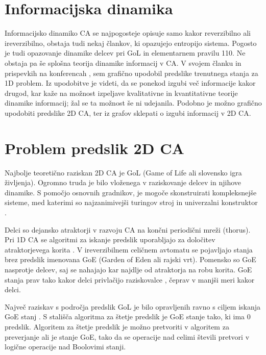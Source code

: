 \documentclass[12pt,a4paper,openany,twoside]{book}
\begin{document}
\section{Informacijska dinamika}

Informacijsko dinamiko CA se najpogosteje opisuje samo kakor reverzibilno ali ireverzibilno,
obstaja tudi nekaj člankov, ki opazujejo entropijo sistema.
Pogosto je tudi opazovanje dinamike delcev pri GoL in elementarnem pravilu 110.
Ne obstaja pa še splošna teorija dinamike informacij v CA.
V svojem članku \cite{JerasDobnikar2007} in prispevkih na konferencah \cite{DBLP:conf/iccS/JerasD06, DBLP:conf/automata/Jeras08},
sem grafično upodobil predslike trenutnega stanja za 1D problem.
Iz upodobitve je videti, da se ponekod izgubi več informacije kakor drugod,
kar kaže na možnost izpeljave kvalitativne in kvantitativne teorije dinamike informacij;
žal se ta možnost še ni udejanila. Podobno je možno grafično upodobiti predslike 2D CA,
ter iz grafov sklepati o izgubi informacij v 2D CA.

\section{Problem predslik 2D CA}

Najbolje teoretično raziskan 2D CA je GoL (Game of Life ali slovensko igra življenja).
Ogromno truda je bilo vloženega v raziskovanje delcev in njihove dinamike. S pomočjo
osnovnih gradnikov, je mogoče skonstruirati kompleksnejše sisteme, med katerimi so
najzanimivejši turingov stroj \cite{Rendell2001} in univerzalni konstruktor \cite{Greene2013}.

Delci so dejansko atraktorji v razvoju CA na končni periodični mreži (thorus).
Pri 1D CA se algoritmi za iskanje predslik uporabljajo za določitev atraktorjevega korita \cite{Wuensche1992}.
V ireverzibilnem celičnem avtomatu se pojavljajo stanja brez predslik imenovana GoE
(Garden of Eden ali rajski vrt). Pomensko so GoE nasprotje delcev, saj se nahajajo kar
najdlje od atraktorja na robu korita. GoE stanja prav tako kakor delci privlačijo raziskovalce \cite{},
čeprav v manjši meri kakor delci.

Največ raziskav s področja predslik GoL je bilo opravljenih ravno s ciljem iskanja GoE stanj \cite{}.
S stališča algoritma za štetje predslik je GoE stanje tako, ki ima 0 predslik.
Algoritem za štetje predslik je možno pretvoriti v algoritem za preverjanje ali je stanje GoE,
tako da se operacije nad celimi števili pretvori v logične operacije nad Boolovimi stanji.
\end{document}
